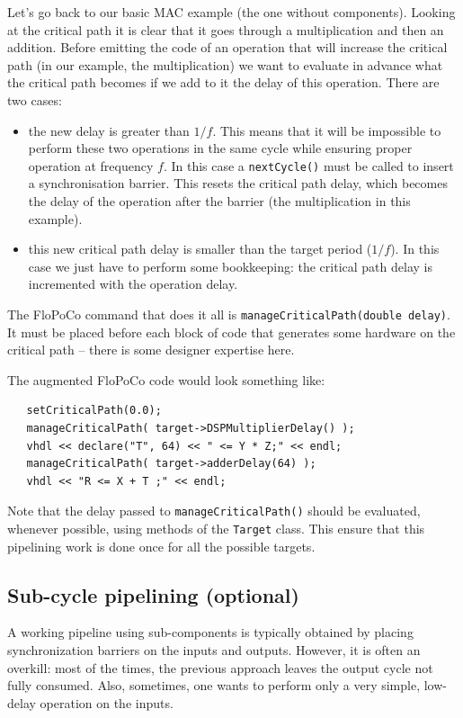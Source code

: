 \documentclass{article}
\begin{document}
Let's go back to our basic MAC example (the one without
components). Looking at the critical path it is clear that it goes
through a multiplication and then an addition. Before emitting the
code of an operation that will increase the critical path (in our
example, the multiplication) we want to evaluate in advance what the
critical path becomes if we add to it the delay of this
operation. There are two cases:
\begin{itemize}
\item the new delay is greater than $1/f$. This means that it will be
  impossible to perform these two operations in the same cycle while
  ensuring proper operation at frequency $f$. In this case a
  \verb!nextCycle()!  must be called to insert a
  synchronisation barrier. This resets the critical path delay, which becomes  the
  delay of the operation after the barrier (the multiplication in this
  example).
\item this new critical path delay is smaller than the target period
  ($1/f$). In this case we just have to perform some bookkeeping: the
  critical path delay is incremented with the operation delay.
\end{itemize}

The FloPoCo command that does it all is
\verb!manageCriticalPath(double delay)!. It must be placed before each
block of code that generates some hardware on the critical path --
there is some designer expertise here.

The augmented FloPoCo code would look something like:

\begin{verbatim}
   setCriticalPath(0.0);
   manageCriticalPath( target->DSPMultiplierDelay() );
   vhdl << declare("T", 64) << " <= Y * Z;" << endl;
   manageCriticalPath( target->adderDelay(64) );
   vhdl << "R <= X + T ;" << endl;
\end{verbatim}

Note that the delay passed to \texttt{manageCriticalPath()} should be
evaluated, whenever possible, using methods of the \texttt{Target}
class. This ensure that this pipelining work is done once for all the possible targets. 


\subsection{Sub-cycle pipelining (optional)}

A working pipeline using sub-components is typically obtained by
placing synchronization barriers on the inputs and outputs. However,
it is often an overkill: most of the times, the previous approach
leaves the output cycle not fully consumed. Also, sometimes, one wants
to perform only a very simple, low-delay operation on the inputs.
\end{document}
